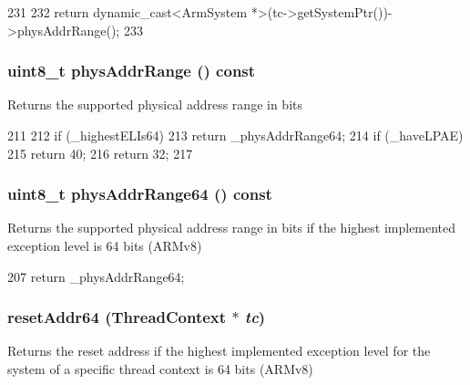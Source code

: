 \begin{DoxyCode}
231 {
232     return dynamic_cast<ArmSystem *>(tc->getSystemPtr())->physAddrRange();
233 }
\end{DoxyCode}
\hypertarget{classArmSystem_aecc15d8d848b1cee0bbe7dac86d01ec1}{
\subsubsection[{physAddrRange}]{\setlength{\rightskip}{0pt plus 5cm}uint8\_\-t physAddrRange () const}}
\label{classArmSystem_aecc15d8d848b1cee0bbe7dac86d01ec1}
Returns the supported physical address range in bits 


\begin{DoxyCode}
211     {
212         if (_highestELIs64)
213             return _physAddrRange64;
214         if (_haveLPAE)
215             return 40;
216         return 32;
217     }
\end{DoxyCode}
\hypertarget{classArmSystem_a4ab7e9eea0ca7202f2f83655f5dd1571}{
\subsubsection[{physAddrRange64}]{\setlength{\rightskip}{0pt plus 5cm}uint8\_\-t physAddrRange64 () const}}
\label{classArmSystem_a4ab7e9eea0ca7202f2f83655f5dd1571}
Returns the supported physical address range in bits if the highest implemented exception level is 64 bits (ARMv8) 


\begin{DoxyCode}
207 { return _physAddrRange64; }
\end{DoxyCode}
\hypertarget{classArmSystem_a04b1e5b5c4e565e6250ef5a38537205a}{
\subsubsection[{resetAddr64}]{ resetAddr64 ({\bf ThreadContext} $\ast$ {\em tc})}}
\label{classArmSystem_a04b1e5b5c4e565e6250ef5a38537205a}
Returns the reset address if the highest implemented exception level for the system of a specific thread context is 64 bits (ARMv8) 


